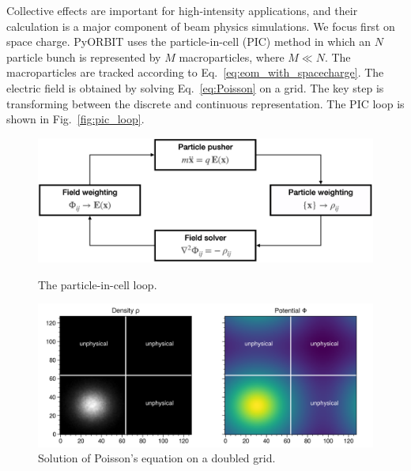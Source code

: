 Collective effects are important for high-intensity applications, and their calculation is a major component of beam physics simulations. We focus first on space charge. PyORBIT uses the particle-in-cell (PIC) method in which an $N$ particle bunch is represented by $M$ macroparticles, where $M \ll N$. The macroparticles are tracked according to Eq.~\eqref{eq:eom_with_spacecharge}. The electric field is obtained by solving Eq.~\eqref{eq:Poisson} on a grid. The key step is transforming between the discrete and continuous representation. The PIC loop is shown in Fig.~\ref{fig:pic_loop}. 
%
\begin{figure}[!p]
    \centering
    \includegraphics[width=\textwidth]{Images/chapter3/pic_loop.png}
    \caption{\label{fig:pic_loop}The particle-in-cell loop.}
    \vfill
    \vspace*{2.5cm}
    \vfill
    \includegraphics[width=\textwidth]{Images/chapter3/poisson.png}
    \caption{\label{fig:poisson}Solution of Poisson's equation on a doubled grid.}
    
\end{figure}
%

